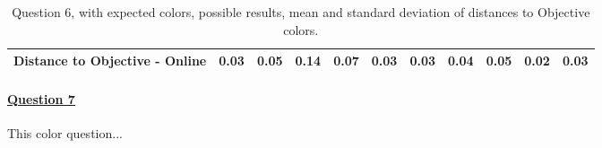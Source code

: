 \begin{table}[H]
{\begin{tabular}{lccccccccccccc}
    \multicolumn{4}{l}{Distance to Objective - Online}                                                                                               & \multicolumn{1}{|c}{0.03}        & \multicolumn{1}{c|}{0.05}    & \multicolumn{1}{|c}{0.14}        & \multicolumn{1}{c|}{0.07}    & \multicolumn{1}{|c}{0.03}       & \multicolumn{1}{c|}{0.03}    & \multicolumn{1}{|c}{0.04}        & \multicolumn{1}{c|}{0.05}    & \multicolumn{1}{|c}{\textbf{0.02}}       & \multicolumn{1}{c|}{0.03}    \\ \hline
    \end{tabular}}
  \caption[Question 6, with expected Results.]{Question 6, with expected colors, possible results, mean and standard deviation of distances to Objective colors.}
  \label{table:lab_q6_expected}
\end{table}
%
\paragraph{\ul{Question 7}}
%
This color question...
%
